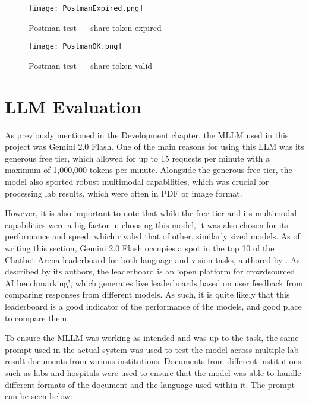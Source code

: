 \begin{figure}[htbp]
    \centering
    \texttt{[image: PostmanExpired.png]}
    \caption{Postman test --- share token expired}\label{fig:postman2}
\end{figure}

\begin{figure}[htbp]
    \centering
    \texttt{[image: PostmanOK.png]}
    \caption{Postman test --- share token valid}\label{fig:postman3}
\end{figure}

\FloatBarrier{}

\section{LLM Evaluation}

As previously mentioned in the Development chapter, the MLLM used in this project was Gemini 2.0 Flash. One of the main reasons for using this LLM was its generous free tier, which allowed for up to 15 requests per minute with a maximum of 1,000,000 tokens per minute. Alongside the generous free tier, the model also sported robust multimodal capabilities, which was crucial for processing lab results, which were often in PDF or image format. 

However, it is also important to note that while the free tier and its multimodal capabilities were a big factor in choosing this model, it was also chosen for its performance and speed, which rivaled that of other, similarly sized models. As of writing this section, Gemini 2.0 Flash occupies a spot in the top 10 of the Chatbot Arena leaderboard for both language and vision tasks, authored by \textcite{chatbotarena}. As described by its authors, the leaderboard is an `open platform for crowdsourced AI benchmarking', which generates live leaderboards based on user feedback from comparing responses from different models. As such, it is quite likely that this leaderboard is a good indicator of the performance of the models, and good place to compare them.

To ensure the MLLM was working as intended and was up to the task, the same prompt used in the actual system was used to test the model across multiple lab result documents from various institutions. Documents from different institutions such as labs and hospitals were used to ensure that the model was able to handle different formats of the document and the language used within it. The prompt can be seen below:

